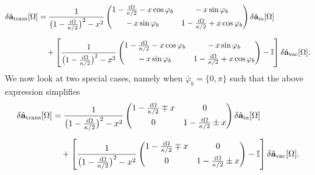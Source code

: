 \newpage
\begin{equation}
\begingroup
\setlength{\arraycolsep}{5pt}
\renewcommand{\arraystretch}{1.1}
\begin{aligned}
\delta\hat{\mathbf a}_{\mathrm{trans}}[\Omega]
&=
\frac{1}{\bigl(1-\tfrac{i\Omega}{\kappa/2}\bigr)^2 - x^2}
\begin{pmatrix}
1-\tfrac{i\Omega}{\kappa/2}-x\cos\varphi_b & -\,x\sin\varphi_b \\[4pt]
-\,x\sin\varphi_b & 1-\tfrac{i\Omega}{\kappa/2}+x\cos\varphi_b
\end{pmatrix}
\delta\hat{\mathbf a}_{\mathrm{in}}[\Omega] \\[6pt]
&\quad+
\left[
\frac{1}{\bigl(1-\tfrac{i\Omega}{\kappa/2}\bigr)^2 - x^2}
\begin{pmatrix}
1-\tfrac{i\Omega}{\kappa/2}-x\cos\varphi_b & -\,x\sin\varphi_b \\[4pt]
-\,x\sin\varphi_b & 1-\tfrac{i\Omega}{\kappa/2}+x\cos\varphi_b
\end{pmatrix}
- \mathbb{I}
\right]
\delta\hat{\mathbf a}_{\mathrm{vac}}[\Omega].
\end{aligned}
\endgroup
\end{equation}
We now look at two special cases, namely when $\bar\varphi_b=\{0,\pi\}$ such that the above expression simplifies 
\begin{equation}
\begingroup
\setlength{\arraycolsep}{5pt}
\renewcommand{\arraystretch}{1.1}
\begin{aligned}
\delta\hat{\mathbf a}_{\mathrm{trans}}[\Omega]
&=
\frac{1}{\bigl(1-\tfrac{i\Omega}{\kappa/2}\bigr)^2 - x^2}
\begin{pmatrix}
1-\tfrac{i\Omega}{\kappa/2}\mp x & 0 \\[4pt]
0 & 1-\tfrac{i\Omega}{\kappa/2}\pm x
\end{pmatrix}
\delta\hat{\mathbf a}_{\mathrm{in}}[\Omega] \\[6pt]
&\quad+
\left[
\frac{1}{\bigl(1-\tfrac{i\Omega}{\kappa/2}\bigr)^2 - x^2}
\begin{pmatrix}
1-\tfrac{i\Omega}{\kappa/2}\mp x &0\\[4pt]
0 & 1-\tfrac{i\Omega}{\kappa/2}\pm x
\end{pmatrix}
- \mathbb{I}
\right]
\delta\hat{\mathbf a}_{\mathrm{vac}}[\Omega].
\end{aligned}
\endgroup
\end{equation}


